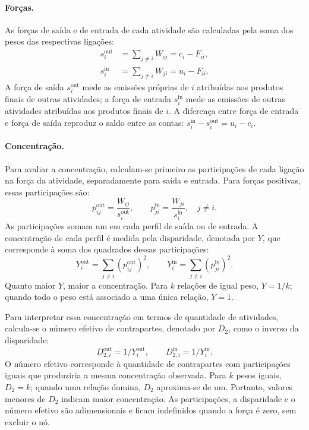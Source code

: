\paragraph{Forças.}
As forças de saída e de entrada de cada atividade são calculadas pela soma dos pesos das respectivas ligações:
\begin{equation}
\begin{aligned}
s_i^{\mathrm{out}}&=\sum_{j\ne i}W_{ij}=c_i-F_{ii},\\
s_i^{\mathrm{in}}&=\sum_{j\ne i}W_{ji}=u_i-F_{ii}.
\end{aligned}
\label{eq:forcas-externas}
\end{equation}
A força de saída $s_i^{\mathrm{out}}$ mede as emissões próprias de $i$ atribuídas aos produtos finais de outras atividades; a força de entrada $s_i^{\mathrm{in}}$ mede as emissões de outras atividades atribuídas aos produtos finais de $i$. A diferença entre força de entrada e força de saída reproduz o saldo entre as contas: $s_i^{\mathrm{in}}-s_i^{\mathrm{out}}=u_i-c_i$.

\paragraph{Concentração.}
Para avaliar a concentração, calculam-se primeiro as participações de cada ligação na força da atividade, separadamente para saída e entrada. Para forças positivas, essas participações são:
\begin{equation}
p_{ij}^{\mathrm{out}}=\frac{W_{ij}}{s_i^{\mathrm{out}}},\qquad
p_{ji}^{\mathrm{in}}=\frac{W_{ji}}{s_i^{\mathrm{in}}},\quad j\ne i.
\label{eq:participacoes-externas}
\end{equation}
As participações somam um em cada perfil de saída ou de entrada. A concentração de cada perfil é medida pela disparidade, denotada por $Y$, que corresponde à soma dos quadrados dessas participações:
\begin{equation}
Y_i^{\mathrm{out}}=\sum_{j\ne i}(p_{ij}^{\mathrm{out}})^2,\qquad
Y_i^{\mathrm{in}}=\sum_{j\ne i}(p_{ji}^{\mathrm{in}})^2.
\label{eq:disparidade}
\end{equation}
Quanto maior $Y$, maior a concentração. Para $k$ relações de igual peso, $Y=1/k$; quando todo o peso está associado a uma única relação, $Y=1$.

Para interpretar essa concentração em termos de quantidade de atividades, calcula-se o número efetivo de contrapartes, denotado por $D_2$, como o inverso da disparidade:
\[
D_{2,i}^{\mathrm{out}}=1/Y_i^{\mathrm{out}},\qquad
D_{2,i}^{\mathrm{in}}=1/Y_i^{\mathrm{in}}.
\]
O número efetivo corresponde à quantidade de contrapartes com participações iguais que produziria a mesma concentração observada. Para $k$ pesos iguais, $D_2=k$; quando uma relação domina, $D_2$ aproxima-se de um. Portanto, valores menores de $D_2$ indicam maior concentração. As participações, a disparidade e o número efetivo são adimensionais e ficam indefinidos quando a força é zero, sem excluir o nó.

